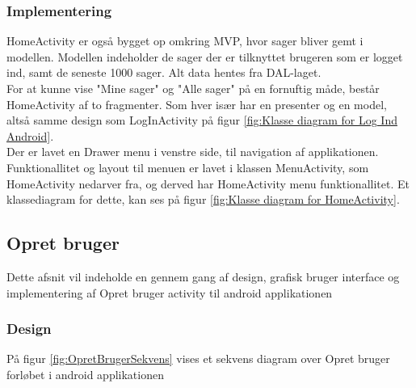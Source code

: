 	\subsubsection{Implementering}\label{HomePageImp}
	HomeActivity er også bygget op omkring MVP, hvor sager bliver gemt i modellen. Modellen indeholder de sager der er tilknyttet brugeren som er logget ind, samt de seneste 1000 sager. Alt data hentes fra DAL-laget.
	\\For at kunne vise "Mine sager" og "Alle sager" på en fornuftig måde, består HomeActivity af to fragmenter. Som hver især har en presenter og en model, altså samme design som LogInActivity på figur \ref{fig:Klasse diagram for Log Ind Android}.
	\\Der er lavet en Drawer menu i venstre side, til navigation af applikationen. Funktionallitet og layout til menuen er lavet i klassen MenuActivity, som HomeActivity nedarver fra, og derved har HomeActivity menu funktionallitet.
	Et klassediagram for dette, kan ses på figur \ref{fig:Klasse diagram for HomeActivity}.
	 
	\pagebreak
	
	\subsection{Opret bruger}
	Dette afsnit vil indeholde en gennem gang af design, grafisk bruger interface og implementering af Opret bruger activity til android applikationen
	\subsubsection{Design}
	På figur \ref{fig:OpretBrugerSekvens} vises et sekvens diagram over Opret bruger forløbet i android applikationen
	
